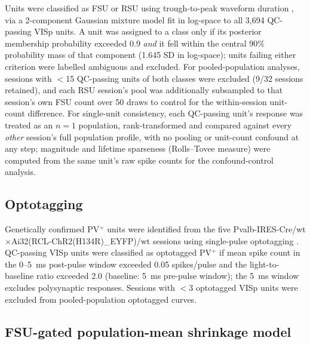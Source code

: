 \documentclass[11pt,onecolumn]{article}
\begin{document}
Units were classified as FSU or RSU using trough-to-peak waveform
duration \citep{bartho2004,mccormick1985}, via a 2-component Gaussian
mixture model \citep{trainito2019} fit in log-space to all 3,694
QC-passing VISp units. A unit was assigned to a class only if its
posterior membership probability exceeded 0.9 \emph{and} it fell within
the central 90\% probability mass of that component (1.645 SD in
log-space); units failing either criterion were labelled ambiguous and
excluded. For pooled-population analyses, sessions with $<$15 QC-passing
units of both classes were excluded (9/32 sessions retained), and each
RSU session's pool was additionally subsampled to that session's own FSU
count over 50 draws to control for the within-session unit-count
difference. For single-unit consistency, each QC-passing unit's response
was treated as an $n=1$ population, rank-transformed and compared against
every \emph{other} session's full population profile, with no pooling or
unit-count confound at any step; magnitude and lifetime sparseness
(Rolls--Tovee measure) were computed from the same unit's raw spike counts
for the confound-control analysis.

\subsection{Optotagging}
\label{Methods:Optotagging}

Genetically confirmed PV$^+$ units were identified from the five
Pvalb-IRES-Cre/wt$\times$Ai32(RCL-ChR2(H134R)\_EYFP)/wt \citep{madisen2012}
sessions using single-pulse optotagging \citep{lima2009,cardin2010}. QC-passing
VISp units were classified as optotagged PV$^+$ if mean spike count in the
0--5~ms post-pulse window exceeded 0.05 spikes/pulse and the
light-to-baseline ratio exceeded 2.0 (baseline: 5~ms pre-pulse window);
the 5~ms window excludes polysynaptic responses. Sessions with $<$3
optotagged VISp units were excluded from pooled-population optotagged
curves.

\subsection{FSU-gated population-mean shrinkage model}
\label{Methods:Shrinkage}
\end{document}

